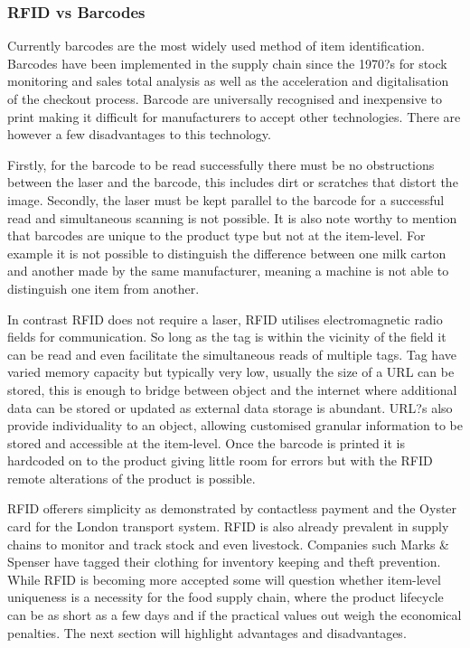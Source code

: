 \documentclass[a4paper, 11pt]{article}
\begin{document}
\subsubsection{RFID vs Barcodes}Currently barcodes are the most widely used method of item identification. Barcodes have been implemented in the supply chain since the 1970?s for stock monitoring and sales total analysis as well as the acceleration and digitalisation of the checkout process. Barcode are universally recognised and inexpensive to print making it difficult for manufacturers to accept other technologies. There are however a few disadvantages to this technology.

Firstly, for the barcode to be read successfully there must be no obstructions between the laser and the barcode, this includes dirt or scratches that distort the image. Secondly, the laser must be kept parallel to the barcode for a successful read and simultaneous scanning is not possible. It is also note worthy to mention that barcodes are unique to the product type but not at the item-level. For example it is not possible to distinguish the difference between one milk carton and another made by the same manufacturer, meaning a machine is not able to distinguish one item from another.

In contrast RFID does not require a laser, RFID utilises electromagnetic radio fields for communication. So long as the tag is within the vicinity of the field it can be read and even facilitate the simultaneous reads of multiple tags. Tag have varied memory capacity but typically very low, usually the size of a URL can be stored, this is enough to bridge between object and the internet where additional data can be stored or updated as external data storage is abundant. URL?s also provide individuality to an object, allowing customised granular information to be stored and accessible at the item-level. Once the barcode is printed it is hardcoded on to the product giving little room for errors but with the RFID remote alterations of the product is possible.

RFID offerers simplicity as demonstrated by contactless payment and the Oyster card for the London transport system. RFID is also already prevalent in supply chains to monitor and track stock and even livestock. Companies such Marks \& Spenser have tagged their clothing for inventory keeping and theft prevention. While RFID is becoming more accepted some will question whether item-level uniqueness is a necessity for the food supply chain, where the product lifecycle can be as short as a few days and if the practical values out weigh the economical penalties. The next section will highlight advantages and disadvantages.
\end{document}
